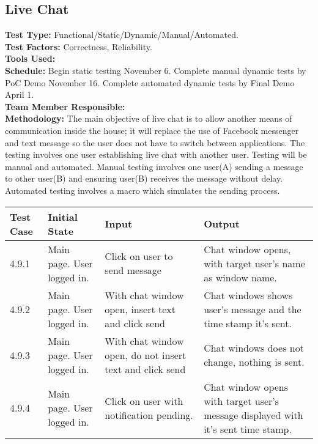 \documentclass[12pt]{article}
\begin{document}
\subsection{Live Chat}
\textbf{Test Type:} Functional/Static/Dynamic/Manual/Automated. \\
\textbf{Test Factors:} Correctness, Reliability. \\
\textbf{Tools Used:} \\
\textbf{Schedule:} Begin static testing November 6. Complete manual dynamic tests by PoC Demo November 16. Complete automated dynamic tests by Final Demo April 1. \\
\textbf{Team Member Responsible:} \\
\textbf{Methodology:} The main objective of live chat is to allow another means of communication inside the house; it will replace the use of Facebook messenger and text message so the user does not have to switch between applications. The testing involves one user establishing live chat with another user. Testing will be manual and automated. Manual testing involves one user(A) sending a message to other user(B) and ensuring user(B) receives the message without delay. Automated testing involves a macro which simulates the sending process.
\newline
\newline
\newline
\newline
\begin{longtable}{|p{2cm}|p{3cm}|p{5cm}|p{5cm}|}
\hline
\textbf{Test Case}  & \textbf{Initial State} & \textbf{Input} & \textbf{Output} \\ \hline
4.9.1 & Main page. User logged in. & Click on user to send message & Chat window opens, with target user's name as window name. \\ 
\hline
4.9.2 & Main page. User logged in. & With chat window open, insert text and click send & Chat windows shows user's message and the time stamp it's sent. \\ 
\hline
4.9.3 & Main page. User logged in. & With chat window open, do not insert text and click send & Chat windows does not change, nothing is sent. \\ 
\hline
4.9.4 & Main page. User logged in. & Click on user with notification pending. & Chat window opens with target user's message displayed with it's sent time stamp. \\
\hline
\end{longtable}

\end{document}
